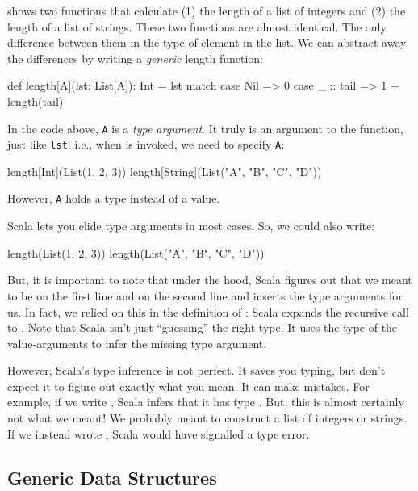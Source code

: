 \documentclass{book}
\begin{document}
 shows two functions that calculate (1) the length of a list
of integers and (2) the length of a list of strings. These two functions
are almost identical. The only difference between them in the type of
element in the list. We can abstract away the differences by writing
a \emph{generic} length function:
%
\begin{scalacode}
def length[A](lst: List[A]): Int = lst match {
  case Nil => 0
  case _ :: tail => 1 + length(tail)
}
\end{scalacode}

In the code above, \verb|A| is a \emph{type argument}. It truly is an argument
to the function, just like \verb|lst|. i.e., when  is
invoked, we need to specify \verb|A|:
%
\begin{scalacode}
length[Int](List(1, 2, 3))
length[String](List("A", "B", "C", "D"))
\end{scalacode}
%
However, \verb|A| holds a type instead of a value.

Scala lets you elide type arguments in most cases. So, we could also write:
%
\begin{scalacode}
length(List(1, 2, 3))
length(List("A", "B", "C", "D"))
\end{scalacode}
%
But, it is important to note that under the hood, Scala figures out that we
meant  to be  on the first line and
 on the second line and inserts the type arguments for us.
In fact, we relied on this in the definition of : Scala
expands the recursive call  to
. Note that Scala isn't just ``guessing'' the
right type. It uses the type of the value-arguments to infer the missing
type argument.

However, Scala's type inference is not perfect. It saves you typing, but don't
expect it to figure out exactly what you mean. It can make mistakes.
For example, if we write , Scala infers
that it has type . But, this is almost certainly
not what we meant! We probably meant to construct a list of integers
or strings. If we instead wrote , Scala
would have signalled a type error.

\subsection{Generic Data Structures}
\end{document}
